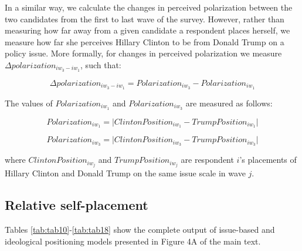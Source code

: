 \documentclass[
  12pt,
]{article}
\begin{document}
In a similar way, we calculate the changes in perceived polarization between the two candidates from the first to last wave of the survey. However, rather than measuring how far away from a given candidate a respondent places herself, we measure how far she perceives Hillary Clinton to be from Donald Trump on a policy issue. More formally, for changes in perceived polarization we measure \(\Delta polarization_{{iw_{3}}-{iw_{1}}}\), such that:

\[\Delta polarization_{{iw_{3}}-{iw_{1}}} = Polarization_{iw_{3}} - Polarization_{iw_{1}}\]

The values of \(Polarization_{iw_{1}}\) and \(Polarization_{iw_{3}}\) are measured as follows:

\[Polarization_{iw_{1}} = \lvert ClintonPosition_{iw_{1}} - TrumpPosition_{iw_{1}} \rvert\]

\[Polarization_{iw_{3}} = \lvert ClintonPosition_{iw_{3}} - TrumpPosition_{iw_{3}} \rvert\]

where \(ClintonPosition_{iw_{j}}\) and \(TrumpPosition_{iw_{j}}\) are respondent \(i\)'s placements of Hillary Clinton and Donald Trump on the same issue scale in wave \(j\).

\clearpage

\hypertarget{relative-self-placement}{%
\subsection{Relative self-placement}\label{relative-self-placement}}

Tables \ref{tab:tab10}-\ref{tab:tab18} show the complete output of issue-based and ideological positioning models presented in Figure 4A of the main text.
\end{document}
